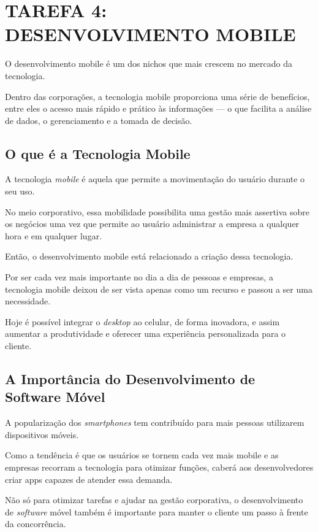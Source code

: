 
\chapter{TAREFA 4: DESENVOLVIMENTO MOBILE}
\label{sec:tarefa4}

O desenvolvimento mobile é um dos nichos que mais crescem no mercado da tecnologia.

Dentro das corporações, a tecnologia mobile proporciona uma série de benefícios, entre eles o acesso mais rápido e prático às informações — o que facilita a análise de dados, o gerenciamento e a tomada de decisão.

\section{O que é a Tecnologia Mobile}

A tecnologia \textit{mobile} é aquela que permite a movimentação do usuário durante o seu uso.

No meio corporativo, essa mobilidade possibilita uma gestão mais assertiva sobre os negócios uma vez que permite ao usuário administrar a empresa a qualquer hora e em qualquer lugar.

Então, o desenvolvimento mobile está relacionado a criação dessa tecnologia.

Por ser cada vez mais importante no dia a dia de pessoas e empresas, a tecnologia mobile deixou de ser vista apenas como um recurso e passou a ser uma necessidade.

Hoje é possível integrar o \textit{desktop} ao celular, de forma inovadora, e assim aumentar a produtividade e oferecer uma experiência personalizada para o cliente.

\section{A Importância do Desenvolvimento de Software Móvel}

A popularização dos \textit{smartphones} tem contribuído para mais pessoas utilizarem dispositivos móveis.

Como a tendência é que os usuários se tornem cada vez mais mobile e as empresas recorram a tecnologia para otimizar funções, caberá aos desenvolvedores criar apps capazes de atender essa demanda.

Não só para otimizar tarefas e ajudar na gestão corporativa, o desenvolvimento de \textit{software} móvel também é importante para manter o cliente um passo à frente da concorrência.

